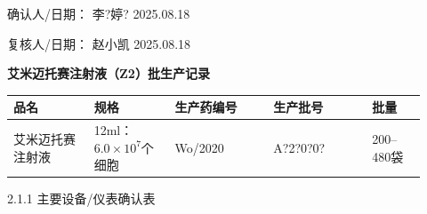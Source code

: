 \documentclass[UTF8,10pt,a4paper,fontset=fandol]{ctexart}
\newcommand{\fieldvalue}[1]{#1}
\newcommand{\handwritten}[1]{#1}
\begin{document}
\noindent
确认人/日期：
\fieldvalue{\handwritten{李?婷?}}
\quad
\fieldvalue{\handwritten{2025.08.18}}

\hfill
复核人/日期：
\fieldvalue{\handwritten{赵小凯}}
\quad
\fieldvalue{\handwritten{2025.08.18}}


\newpage

\begin{center}
\textbf{艾米迈托赛注射液（Z2）批生产记录}
\end{center}

\begin{tabular}{|p{0.18\linewidth}|p{0.18\linewidth}|p{0.22\linewidth}|p{0.22\linewidth}|p{0.12\linewidth}|}
\hline
品名 & 规格 & 生产药编号 & 生产批号 & 批量 \\
\hline
\fieldvalue{艾米迈托赛注射液} &
\fieldvalue{12ml：$6.0\times10^{7}$个细胞} &
\fieldvalue{\handwritten{Wo/2020}} &
\fieldvalue{\handwritten{A?2?0?0?}} &
\fieldvalue{200--480袋} \\
\hline
\end{tabular}

\vspace{0.4em}

2.1.1 主要设备/仪表确认表
\end{document}
